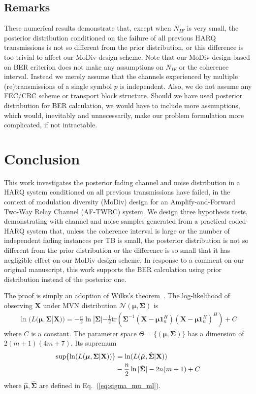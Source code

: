 \documentclass[journal,draftcls,onecolumn,12pt,twoside]{IEEEtran}
\begin{document}
\subsection{Remarks}
These numerical results demonstrate that, except when $N_{IF}$ is very small,
the posterior distribution conditioned on the failure of all previous HARQ transmissions is not so different from the
prior distribution, or this difference is too trivial to affect our MoDiv design
scheme. Note that our MoDiv design based on BER criterion does not make any
assumptions on $N_{IF}$ or the coherence interval. Instead we merely assume that
the channels experienced by multiple (re)transmissions of a single symbol $p$ is
independent. Also, we do not assume any FEC/CRC scheme or transport block
structure. Should we have used posterior distribution for BER
calculation, we would have to include more assumptions,
which would, inevitably and unnecessarily, make our problem formulation more
complicated, if not intractable.

\section{Conclusion}
\label{sec:conclusion}
This work investigates the posterior fading channel and noise distribution in
a HARQ system conditioned on all previous transmissions have failed, in the
context of modulation diversity (MoDiv) design for an Amplify-and-Forward
Two-Way Relay Channel (AF-TWRC) system. We design three hypothesis tests,
demonstrating with channel and noise samples generated from a practical
coded-HARQ system that, unless the coherence interval is large or the number
of independent fading instances per TB is small, the posterior distribution is
not so different from the prior distribution or the difference is so small that
it has negligible effect on our MoDiv design scheme. In response to a comment on
our original manuscript, this work supports the BER calculation using prior
distribution instead of the posterior one.

\label{append:proof}
The proof is simply an adoption of Wilks's theorem~\cite{wilks1938large}. The
log-likelihood of observing $\mathbf{X}$ under MVN distribution
$\mathcal{N}(\bm{\mu}, \mathbf{\Sigma})$ is
\begin{align}
  \ln(L(\bm{\mu}, \mathbf{\Sigma}|\mathbf{X})) =
  -\frac{n}{2}\ln|\mathbf{\Sigma}|-
  \frac{1}{2}\mbox{tr}(\mathbf{\Sigma}^{-1}(\mathbf{X}
  -\bm{\mu}\mathbf{1}_n^H)(\mathbf{X} -\bm{\mu}\mathbf{1}_n^H)^H) + C  
\end{align}
where $C$ is a constant. The parameter space $\Theta = \{(\bm{\mu},
\mathbf{\Sigma})\}$ has a dimension of $2(m+1)(4m+7)$. Its supremum
\begin{align}
  \sup \{\ln(L(\bm{\mu}, \mathbf{\Sigma}|\mathbf{X}))\} & =
  \ln(L(\hat{\bm{\mu}}, \hat{\mathbf{\Sigma}}|\mathbf{X})) \notag\\
  & -\frac{n}{2}\ln|\hat{\mathbf{\Sigma}}| - 2n(m+1) + C
\end{align}
where $\hat{\bm{\mu}}, \hat{\mathbf{\Sigma}}$ are defined in
Eq.~(\ref{eq:sigma_mu_ml}).
\end{document}
